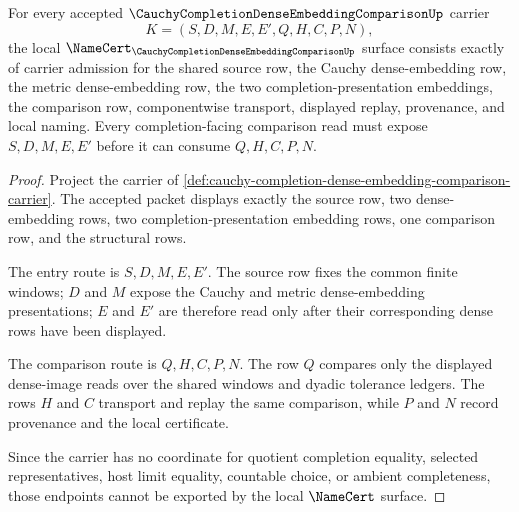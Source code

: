\begin{theorem}
\label{thm:cauchy-completion-dense-embedding-comparison-namecert-obligations}
For every accepted $\CauchyCompletionDenseEmbeddingComparisonUp$ carrier
$$
K=(S,D,M,E,E',Q,H,C,P,N),
$$
the local $\NameCert_{\CauchyCompletionDenseEmbeddingComparisonUp}$ surface consists exactly of carrier admission for the shared source row, the Cauchy dense-embedding row, the metric dense-embedding row, the two completion-presentation embeddings, the comparison row, componentwise transport, displayed replay, provenance, and local naming. Every completion-facing comparison read must expose $S,D,M,E,E'$ before it can consume $Q,H,C,P,N$.
\end{theorem}
\begin{proof}
Project the carrier of \autoref{def:cauchy-completion-dense-embedding-comparison-carrier}. The accepted packet displays exactly the source row, two dense-embedding rows, two completion-presentation embedding rows, one comparison row, and the structural rows.

The entry route is $S,D,M,E,E'$. The source row fixes the common finite windows; $D$ and $M$ expose the Cauchy and metric dense-embedding presentations; $E$ and $E'$ are therefore read only after their corresponding dense rows have been displayed.

The comparison route is $Q,H,C,P,N$. The row $Q$ compares only the displayed dense-image reads over the shared windows and dyadic tolerance ledgers. The rows $H$ and $C$ transport and replay the same comparison, while $P$ and $N$ record provenance and the local certificate.

Since the carrier has no coordinate for quotient completion equality, selected representatives, host limit equality, countable choice, or ambient completeness, those endpoints cannot be exported by the local $\NameCert$ surface.
\end{proof}

